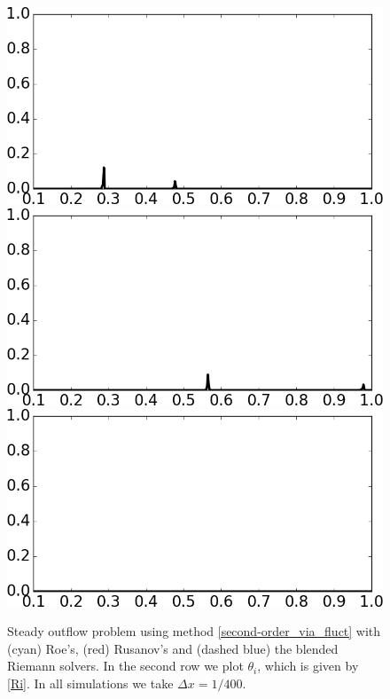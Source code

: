 \documentclass[preprint, 11pt]{article}
\begin{document}
\begin{figure}[!h]
{    \vspace{15pt}
    \includegraphics[scale=0.29]{figures/outflow_1D_Ri_t0p5.png}
    \qquad
    \includegraphics[scale=0.29]{figures/outflow_1D_Ri_t1p3.png}
    \qquad
    \includegraphics[scale=0.29]{figures/outflow_1D_Ri_t10p0.png}
  }
  \caption{
    Steady outflow problem using method \eqref{second-order_via_fluct} with
    (cyan) Roe's, (red) Rusanov's and (dashed blue) the blended Riemann solvers.
    In the second row we plot $\theta_i$, which is given by \eqref{Ri}.
    In all simulations we take $\Delta x=1/400$.
    \label{fig:steady_outflow}}
\end{figure}
\end{document}
